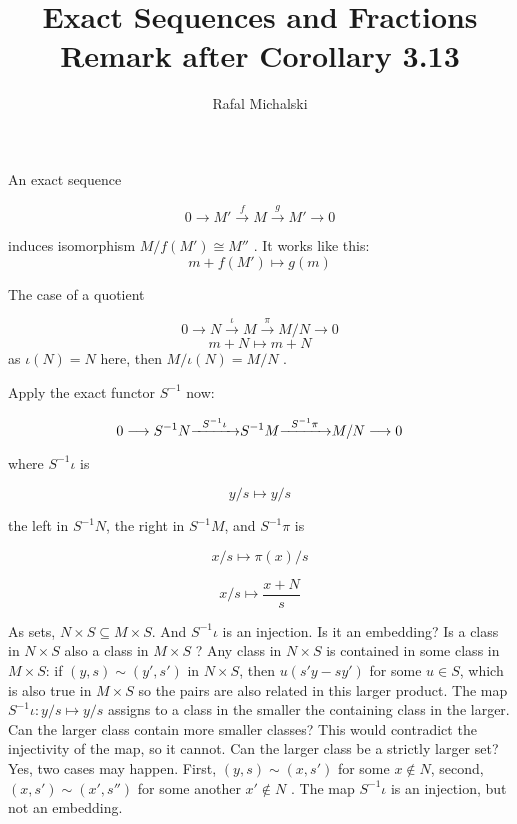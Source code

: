 \documentclass{article}
\title{Exact Sequences and Fractions \\ Remark after Corollary 3.13}
\author{Rafal Michalski}
\date{}
\begin{document}
 

\maketitle

An exact sequence

\[
0 \longrightarrow M' \overset{f}{\longrightarrow} M \overset{g}{\longrightarrow} M' \longrightarrow 0
\]

\noindent
induces isomorphism $M/f(M') \cong M''$ . It works like this:
\[
m + f(M') \mapsto g(m)
\]

\noindent
The case of a quotient

\[
0 \longrightarrow N \overset{\iota}{\longrightarrow} M \overset{\pi}{\longrightarrow} M/N \longrightarrow 0
\]
\[
m + N \mapsto m + N
\]
\noindent
as $\iota(N) = N$ here, then $M / \iota(N) = M/N$ .

\vspace{2mm}

Apply the exact functor $S^{-1}$ now:

\[
0  \longrightarrow S^{-1}N {\xrightarrow{\hspace{2mm}S^{-1}\iota\hspace{2mm}}} S^{-1}M {\xrightarrow{\hspace{2mm}S^{-1}\pi\hspace{2mm}}} M/N \longrightarrow 0
\]

\noindent
where $S^{-1}\iota$ is

\[
y/s \mapsto  y/s
\]

\noindent
the left in $S^{-1}N$, the right in $S^{-1}M$, and $S^{-1}\pi$ is

\[
x/s \mapsto \pi(x)/s 
\]

\[
x/s \mapsto \frac{x + N}{s}
\]

As sets, $N \times S \subseteq M \times S$. And $S^{-1}\iota$ is an injection. Is it an embedding? Is a class in $N \times S$ also a class in $M \times S$ ? Any class in $N \times S$ is contained in some class in $M \times S$: if $(y, s) \sim (y', s')$ in $N \times S$, then $u(s'y - sy')$ for some $u \in S$, which is also true in $M \times S$ so the pairs are also related in this larger product. The map $S^{-1}\iota: y/s \mapsto y/s$ assigns to a class in the smaller the containing class in the larger. Can the larger class contain more smaller classes? This would contradict the injectivity of the map, so it cannot. Can the larger class be a strictly larger set? Yes, two cases may happen. First, $(y, s) \sim (x, s')$ for some $x \notin N$, second, $(x, s') \sim (x', s'')$ for some another $x' \notin N$ . The map $S^{-1}\iota$ is an injection, but not an embedding.
\end{document}
